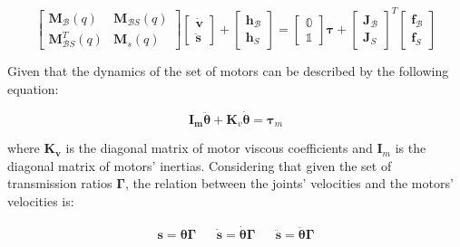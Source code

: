 \begin{equation}
    \begin{bmatrix}
        \mathbf{M} _{\mathcal{B}}(q)     & \mathbf{M} _{\mathcal{B}S}(q) \\
        \mathbf{M} _{\mathcal{B}S} ^T(q) & \mathbf{M} _s(q)
    \end{bmatrix}
    \begin{bmatrix}
        \dot{\mathrm{\mathbf{v}}} \\
        \ddot{\mathbf{s}}
    \end{bmatrix}+
    \begin{bmatrix}
        \mathbf{h} _{\mathcal{B}} \\
        \mathbf{h} _S
    \end{bmatrix}=
    \begin{bmatrix}
        \mathbb{0} \\
        \mathbb{1}
    \end{bmatrix}
    \boldsymbol{\tau}
    +
    \begin{bmatrix}
        \mathbf{J} _{\mathcal{B}} \\
        \mathbf{J} _S
    \end{bmatrix} ^T
    \begin{bmatrix}
        \mathbf{f} _{\mathcal{B}} \\
        \mathbf{f} _S
    \end{bmatrix}
\end{equation}

Given that the dynamics of the set of motors can be described by the following equation:

\begin{equation}
    \label{eqn:mot_dyn}
    \mathbf{I_m} \ddot{\boldsymbol{\theta}} + \mathbf{K}_v \dot{\boldsymbol{\theta}} = \boldsymbol{\tau}_m
\end{equation}

where $\mathbf{K _v}$ is the diagonal matrix of motor viscous coefficients and $\mathbf{I}_m$ is the diagonal matrix of motors' inertias. Considering that given the set of transmission ratios $\boldsymbol{\Gamma}$, the relation between the joints' velocities and the motors' velocities is:

\begin{align}
    \mathbf{s} = \boldsymbol{\theta} \boldsymbol{\Gamma} &  & \dot{\mathbf{s}} = \dot{\boldsymbol{\theta}} \boldsymbol{\Gamma} &  & \ddot{\mathbf{s}} = \ddot{\boldsymbol{\theta}} \boldsymbol{\Gamma}
\end{align}

